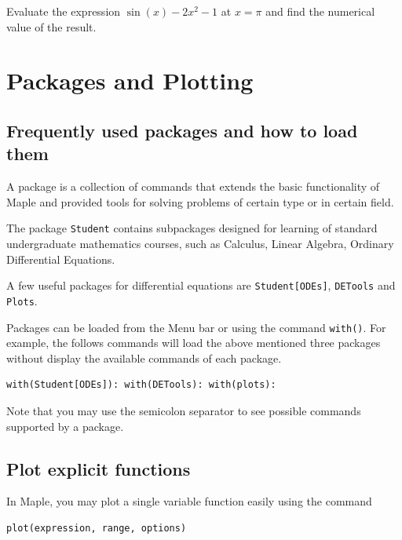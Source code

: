 \documentclass[
  12pt]{elegantbook}
\begin{document}
\begin{exercise}
Evaluate the expression \(\sin(x)-2x^2-1\) at \(x=\pi\) and find the numerical value of the result.
\end{exercise}

\hypertarget{packages-and-plotting}{%
\section{Packages and Plotting}\label{packages-and-plotting}}

\hypertarget{frequently-used-packages-and-how-to-load-them}{%
\subsection{Frequently used packages and how to load them}\label{frequently-used-packages-and-how-to-load-them}}

A package is a collection of commands that extends the basic functionality of Maple and provided tools for solving problems of certain type or in certain field.

The package \texttt{Student} contains subpackages designed for learning of standard undergraduate mathematics courses, such as Calculus, Linear Algebra, Ordinary Differential Equations.

A few useful packages for differential equations are \texttt{Student{[}ODEs{]}}, \texttt{DETools} and \texttt{Plots}.

Packages can be loaded from the Menu bar or using the command \texttt{with()}. For example, the follows commands will load the above mentioned three packages without display the available commands of each package.

\begin{verbatim}
with(Student[ODEs]): with(DETools): with(plots):
\end{verbatim}

Note that you may use the semicolon separator to see possible commands supported by a package.

\hypertarget{plot-explicit-functions}{%
\subsection{Plot explicit functions}\label{plot-explicit-functions}}

In Maple, you may plot a single variable function easily using the command

\begin{verbatim}
plot(expression, range, options)
\end{verbatim}
\end{document}
